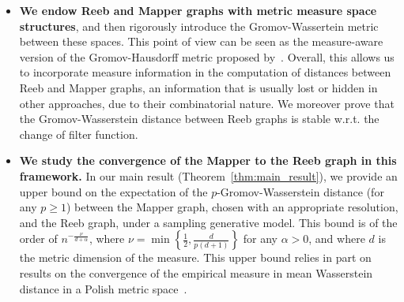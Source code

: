 \documentclass[pdflatex,sn-mathphys-ay]{sn-jnl}%
\theoremstyle{thmstyleone}%
\begin{document}
\begin{itemize}
    \item {\bf We endow Reeb and Mapper graphs with metric measure space structures}, and then rigorously introduce the Gromov-Wassertein metric between these spaces. This point of view can be seen as the measure-aware version of the Gromov-Hausdorff metric proposed by~\citet{carriere2022statistical}. Overall, this allows us to incorporate measure information in the computation of distances between Reeb and Mapper graphs, an information that is usually lost or hidden in other approaches, due to their combinatorial nature. We moreover prove that the Gromov-Wasserstein distance between Reeb graphs is stable w.r.t. the change of filter function.%
    
    \item {\bf We study the convergence of the Mapper to the Reeb graph in this framework.} In our main result (Theorem~\ref{thm:main_result}), we provide an upper bound on the expectation of the $p$-Gromov-Wasserstein  distance (for any $p \geq1$) between the Mapper graph, chosen with an appropriate resolution, and the Reeb graph, under a sampling generative model. This bound is of the order of  $n^{-\frac{\nu}{d+\alpha}} $,
    where $\nu=\min\left\{\frac{1}{2},\frac{d}{p(d+1)}\right\}$ for any $\alpha >0$, and where $d$ is the metric dimension of the measure. This upper bound relies in part on results on the convergence of the empirical measure in mean Wasserstein distance in a Polish metric space~\citep{weed2019sharp}. %
\end{itemize}
\end{document}
